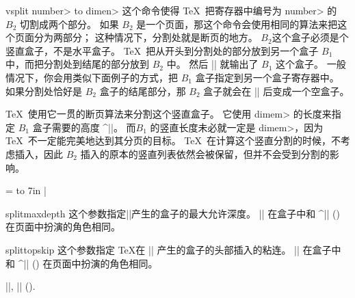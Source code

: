 \begindesc
\cts vsplit {\<number> {\bt to} \<dimen>}
\explain
这个命令使得 \TeX\ 把寄存器中编号为 \<number> 的 $B_2$ 切割成两个部分。
如果 $B_2$ 是一个页面，那这个命令会使用相同的算法来把这个页面分为两部分；
这种情况下，分割处就是断页的地方。
$B_2$这个盒子必须是个竖直盒子，不是水平盒子。
\TeX\ 把从开头到分割处的部分放到另一个盒子 $B_1$ 中，而把分割处到结尾的部分放到 $B_2$ 中。
然后 |\vsplit| 就输出了 $B_1$ 这个盒子。
一般情况下，你会用类似下面例子的方式，把 $B_1$ 盒子指定到另一个盒子寄存器中。
如果分割处恰好是 $B_2$ 盒子的结尾部分，那 $B_2$ 盒子就会在 |\vsplit| 后变成一个空盒子。



\TeX\ 使用它一贯的断页算法来分割这个竖直盒子。
它使用 \<dimem> 的长度来指定 $B_1$ 盒子需要的高度 ^|\pagegoal|。
而$B_1$ 的竖直长度未必就一定是 \<dimem>，因为 \TeX\ 不一定能完美地达到其分页的目标。
\TeX\ 在计算这个竖直分割的时候，不考虑插入，因此 $B_2$ 插入的原本的竖直列表依然会被保留，但并不会受到分割的影响。



\example
{} =  to 7in
|
\endexample
\enddesc



\begindesc
\cts splitmaxdepth {}
\explain
这个参数指定|\vsplit|产生的盒子的最大允许深度。
|\splitmaxdepth| 在盒子中和 ^|\maxdepth| (\xref \maxdepth) 在页面中扮演的角色相同。
\enddesc



\begindesc
\cts splittopskip {}
\explain
这个参数指定 \TeX 在 |\vsplit| 产生的盒子的头部插入的粘连。
|\splittopskip| 在盒子中和 ^|\topskip| (\xref \topskip) 在页面中扮演的角色相同。
\enddesc



\see |\splitbotmark|, |\splitfirstmark| (\xref \splitfirstmark).

\enddescriptions \endchapter \byebye
